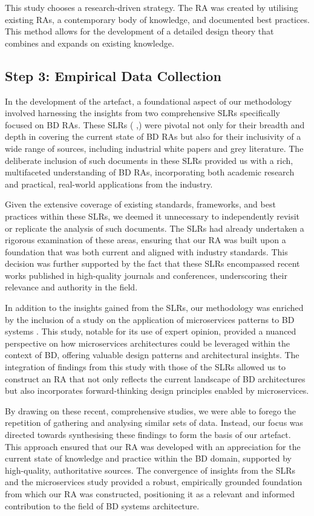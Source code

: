\documentclass[review]{elsarticle}
\begin{document}
This study chooses a research-driven strategy. The RA was created by utilising existing RAs, a contemporary body of knowledge, and documented best practices. This method allows for the development of a detailed design theory that combines and expands on existing knowledge.

\subsection{Step 3: Empirical Data Collection} \label{theSLR}

In the development of the artefact, a foundational aspect of our methodology involved harnessing the insights from two comprehensive SLRs specifically focused on BD RAs. These SLRs (\cite{ataei2022state} ,\cite{AtaeiACIS}) were pivotal not only for their breadth and depth in covering the current state of BD RAs but also for their inclusivity of a wide range of sources, including industrial white papers and grey literature. The deliberate inclusion of such documents in these SLRs provided us with a rich, multifaceted understanding of BD RAs, incorporating both academic research and practical, real-world applications from the industry.

Given the extensive coverage of existing standards, frameworks, and best practices within these SLRs, we deemed it unnecessary to independently revisit or replicate the analysis of such documents. The SLRs had already undertaken a rigorous examination of these areas, ensuring that our RA was built upon a foundation that was both current and aligned with industry standards. This decision was further supported by the fact that these SLRs encompassed recent works published in high-quality journals and conferences, underscoring their relevance and authority in the field.

In addition to the insights gained from the SLRs, our methodology was enriched by the inclusion of a study on the application of microservices patterns to BD systems \cite{ataei2023application}. This study, notable for its use of expert opinion, provided a nuanced perspective on how microservices architectures could be leveraged within the context of BD, offering valuable design patterns and architectural insights. The integration of findings from this study with those of the SLRs allowed us to construct an RA that not only reflects the current landscape of BD architectures but also incorporates forward-thinking design principles enabled by microservices.

By drawing on these recent, comprehensive studies, we were able to forego the repetition of gathering and analysing similar sets of data. Instead, our focus was directed towards synthesising these findings to form the basis of our artefact. This approach ensured that our RA was developed with an appreciation for the current state of knowledge and practice within the BD domain, supported by high-quality, authoritative sources. The convergence of insights from the SLRs and the microservices study provided a robust, empirically grounded foundation from which our RA was constructed, positioning it as a relevant and informed contribution to the field of BD systems architecture.
\end{document}
